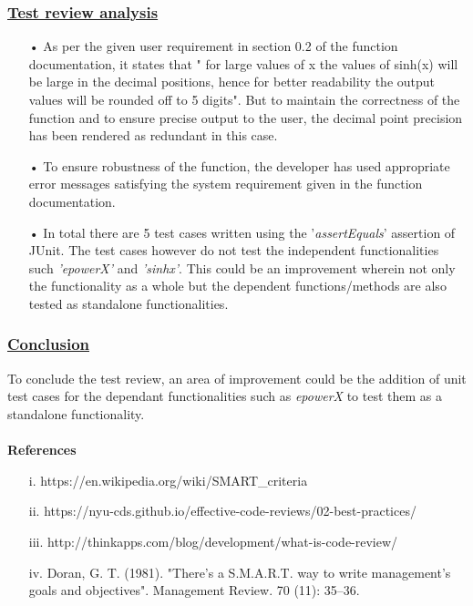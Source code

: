 \documentclass[12pt]{report}
\begin{document}
\subsubsection{\underline{Test review analysis}}
\begin{itemize}
\item[•]As per the given user requirement in section 0.2 of the function documentation, it states that " for large values of x the values of sinh(x) will be large in the decimal
positions, hence for better readability the output values will be rounded
off to 5 digits". But to maintain the correctness of the function and to ensure precise output to the user, the decimal point precision has been rendered as redundant in this case.
\item[•]To ensure robustness of the function, the developer has used appropriate error messages satisfying the system requirement given in the function documentation. 
\item[•]In total there are 5 test cases written using the '\textit{assertEquals}' assertion of JUnit. The test cases however do not test the independent functionalities such \textit{'epowerX'} and \textit{'sinhx'}. This could be an improvement wherein not only the functionality as a whole but the dependent functions/methods are also tested as standalone functionalities.
\end{itemize}
\subsubsection{\underline{Conclusion}}To conclude the test review, an area of improvement could be the addition of unit test cases for the dependant functionalities such as \textit{epowerX} to test them as a standalone functionality.\\\\

\pagebreak
\textbf{References}
	\begin{enumerate}
	\item[i.]https://en.wikipedia.org/wiki/SMART\_criteria
	\item[ii.]https://nyu-cds.github.io/effective-code-reviews/02-best-practices/
	\item[iii.]http://thinkapps.com/blog/development/what-is-code-review/
	\item[iv.] Doran, G. T. (1981). "There's a S.M.A.R.T. way to write management's goals and objectives". Management Review. 70 (11): 35–36.
	\end{enumerate}
\end{document}
